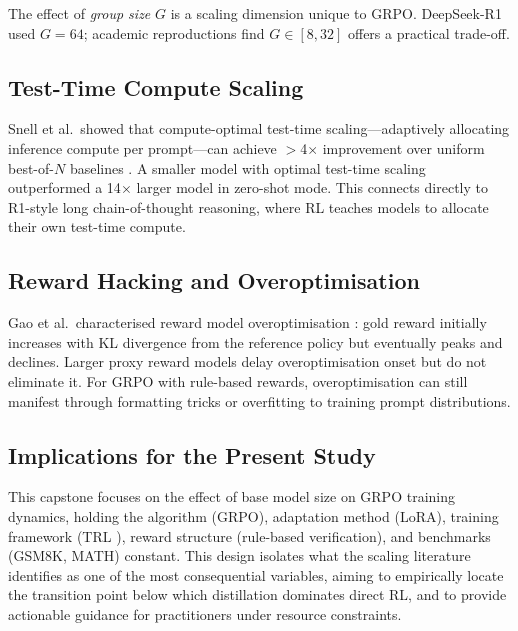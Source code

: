 \documentclass[12pt,a4paper]{report}
\begin{document}
The effect of \emph{group size} $G$ is a scaling dimension unique to GRPO. DeepSeek-R1 used $G = 64$; academic reproductions find $G \in [8, 32]$ offers a practical trade-off.

\subsection{Test-Time Compute Scaling}

Snell et al.\ showed that compute-optimal test-time scaling---adaptively allocating inference compute per prompt---can achieve $>$4$\times$ improvement over uniform best-of-$N$ baselines \cite{snell2024scaling}. A smaller model with optimal test-time scaling outperformed a 14$\times$ larger model in zero-shot mode. This connects directly to R1-style long chain-of-thought reasoning, where RL teaches models to allocate their own test-time compute.

\subsection{Reward Hacking and Overoptimisation}

Gao et al.\ characterised reward model overoptimisation \cite{gao2023scaling}: gold reward initially increases with KL divergence from the reference policy but eventually peaks and declines. Larger proxy reward models delay overoptimisation onset but do not eliminate it. For GRPO with rule-based rewards, overoptimisation can still manifest through formatting tricks or overfitting to training prompt distributions.

\subsection{Implications for the Present Study}

This capstone focuses on the effect of base model size on GRPO training dynamics, holding the algorithm (GRPO), adaptation method (LoRA), training framework (TRL \cite{vonwerra2022trl}), reward structure (rule-based verification), and benchmarks (GSM8K, MATH) constant. This design isolates what the scaling literature identifies as one of the most consequential variables, aiming to empirically locate the transition point below which distillation dominates direct RL, and to provide actionable guidance for practitioners under resource constraints.


\end{document}

